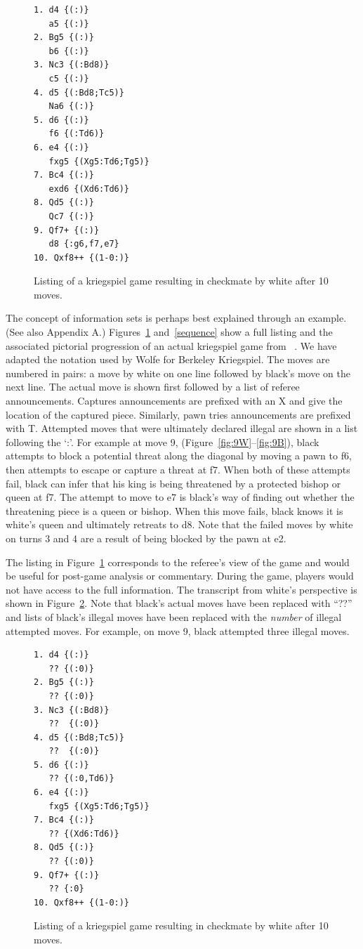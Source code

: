 \documentclass[11pt]{article}
\begin{document}
\begin{figure}
\begin{verbatim}
1. d4 {(:)}
   a5 {(:)}
2. Bg5 {(:)}
   b6 {(:)}
3. Nc3 {(:Bd8)}
   c5 {(:)}
4. d5 {(:Bd8;Tc5)}
   Na6 {(:)}
5. d6 {(:)}
   f6 {(:Td6)}
6. e4 {(:)}
   fxg5 {(Xg5:Td6;Tg5)}
7. Bc4 {(:)}
   exd6 {(Xd6:Td6)}
8. Qd5 {(:)}
   Qc7 {(:)}
9. Qf7+ {(:)} 
   d8 {:g6,f7,e7}
10. Qxf8++ {(1-0:)}
\end{verbatim}
\caption{Listing of a kriegspiel game resulting in checkmate by white after 10 moves.}
\label{listing}
\end{figure}

The concept of information sets is perhaps best explained through an example.  (See also Appendix A.)
Figures~\ref{listing} and~\ref{sequence} show a full listing and the associated pictorial progression of an actual
kriegspiel game from ~\cite{li94chess}.  We have adapted the notation used by Wolfe for Berkeley Kriegspiel.  The moves
are numbered in pairs: a move by white on one line followed by black's move on the next line.  The actual move is shown
first followed by a list of referee announcements.  Captures announcements are prefixed with an X and give the location
of the captured piece.  Similarly, pawn tries announcements are prefixed with T.  Attempted moves that were ultimately
declared illegal are shown in a list following the `:'.  For example at move 9, (Figure~\ref{fig:9W}--\ref{fig:9B}),
black attempts to block a potential threat along the diagonal by moving a pawn to f6, then attempts to escape or capture
a threat at f7.  When both of these attempts fail, black can infer that his king is being threatened by a protected
bishop or queen at f7.  The attempt to move to e7 is black's way of finding out whether the threatening piece is a queen
or bishop.  When this move fails, black knows it is white's queen and ultimately retreats to d8.  Note that the failed
moves by white on turns 3 and 4 are a result of being blocked by the pawn at e2.


The listing in Figure~\ref{listing} corresponds to the referee's view of the game and would be useful for
post-game analysis or commentary.  During the game, players would not have access to the full information.  The
transcript from white's perspective is shown in Figure~\ref{filteredlisting}.  Note that black's actual moves have been
replaced with ``??'' and lists of black's illegal moves have been replaced with the {\em number} of illegal attempted
moves.  For example, on move 9, black attempted three illegal moves.
\begin{figure}
\begin{verbatim}
1. d4 {(:)}
   ?? {(:0)}
2. Bg5 {(:)}
   ?? {(:0)}
3. Nc3 {(:Bd8)}
   ??  {(:0)}
4. d5 {(:Bd8;Tc5)}
   ??  {(:0)}
5. d6 {(:)}
   ?? {(:0,Td6)}
6. e4 {(:)}
   fxg5 {(Xg5:Td6;Tg5)}
7. Bc4 {(:)}
   ?? {(Xd6:Td6)}
8. Qd5 {(:)}
   ?? {(:0)}
9. Qf7+ {(:)} 
   ?? {:0}
10. Qxf8++ {(1-0:)}
\end{verbatim}
\caption{Listing of a kriegspiel game resulting in checkmate by white after 10 moves.}
\label{filteredlisting}
\end{figure}
\end{document}

